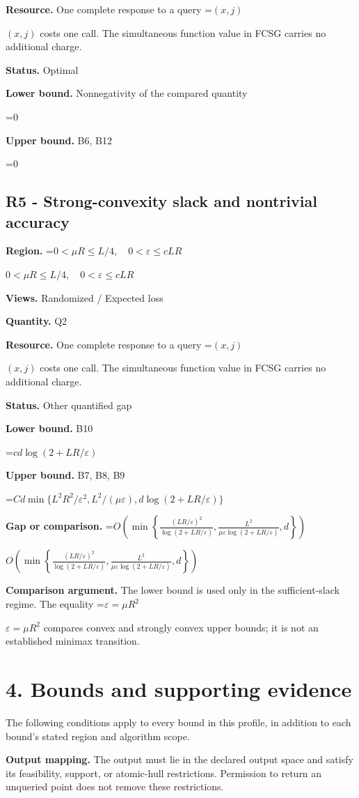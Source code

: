 \documentclass[10pt,a4paper]{article}
\newcommand{\AtlasMath}[1]{\par\begingroup\centering\setbox0=\hbox{$\displaystyle #1$}\ifdim\wd0>1.4\linewidth\typeout{ATLAS WIDE FORMULA: \the\wd0}\fi\ifdim\wd0>\linewidth\resizebox{\linewidth}{!}{\box0}\else\box0\fi\par\endgroup}
\newcommand{\AtlasInlineMath}[1]{\begingroup\setbox0=\hbox{$#1$}\ifdim\wd0>.4\linewidth\endgroup\AtlasMath{#1}\else\endgroup$#1$\fi}
\begin{document}
\textbf{Resource.} One complete response to a query \AtlasInlineMath{(x,j)} costs one call. The simultaneous function value in FCSG carries no additional charge.

\textbf{Status.} Optimal

\textbf{Lower bound.} Nonnegativity of the compared quantity

\AtlasMath{0}
\textbf{Upper bound.} B6, B12

\AtlasMath{0}
\subsection{R5 - Strong-convexity slack and nontrivial accuracy}
\textbf{Region.} \AtlasInlineMath{0<\mu R\le L/4,\quad0<\varepsilon\le cLR}

\textbf{Views.} Randomized / Expected loss

\textbf{Quantity.} Q2

\textbf{Resource.} One complete response to a query \AtlasInlineMath{(x,j)} costs one call. The simultaneous function value in FCSG carries no additional charge.

\textbf{Status.} Other quantified gap

\textbf{Lower bound.} B10

\AtlasMath{cd\log(2+LR/\varepsilon)}
\textbf{Upper bound.} B7, B8, B9

\AtlasMath{Cd\min\{L^2R^2/\varepsilon^2,L^2/(\mu\varepsilon),d\log(2+LR/\varepsilon)\}}
\textbf{Gap or comparison.} \AtlasInlineMath{O\!\left(\min\left\{\frac{(LR/\varepsilon)^2}{\log(2+LR/\varepsilon)},\frac{L^2}{\mu\varepsilon\log(2+LR/\varepsilon)},d\right\}\right)}

\textbf{Comparison argument.} The lower bound is used only in the sufficient-slack regime. The equality \AtlasInlineMath{\varepsilon=\mu R^2} compares convex and strongly convex upper bounds; it is not an established minimax transition.

\section{4. Bounds and supporting evidence}
The following conditions apply to every bound in this profile, in addition to each bound's stated region and algorithm scope.

\textbf{Output mapping.} The output must lie in the declared output space and satisfy its feasibility, support, or atomic-hull restrictions. Permission to return an unqueried point does not remove these restrictions.
\end{document}
